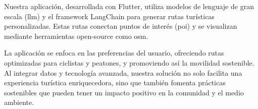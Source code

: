 Nuestra aplicación, desarrollada con Flutter, utiliza modelos de lenguaje de gran escala (\acrfull{llm}) y el framework LangChain para generar rutas turísticas personalizadas. Estas rutas conectan puntos de interés (\acrfull{poi}) y se visualizan mediante herramientas open-source como \acrfull{osm}.

La aplicación se enfoca en las preferencias del usuario, ofreciendo rutas optimizadas para ciclistas y peatones, y promoviendo así la movilidad sostenible. Al integrar datos y tecnología avanzada, nuestra solución no solo facilita una experiencia turística enriquecedora, sino que también fomenta prácticas sostenibles que pueden tener un impacto positivo en la comunidad y el medio ambiente.

